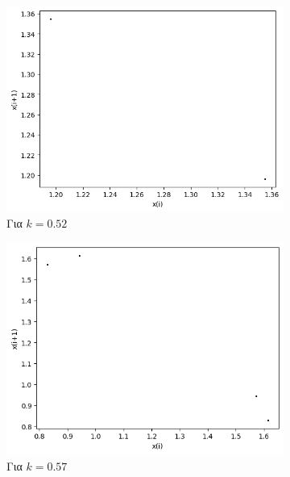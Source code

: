 \begin{figure}[ht]
\begin{subfigure}[b]{0.4\textwidth}
		\centering
		\includegraphics[width=\textwidth]{LateX images/graphs q07/g5}
		\caption{Για $k=0.52$}
		\label{f:k39}
	\end{subfigure}
	\hfill
	\begin{subfigure}[b]{0.4\textwidth}
		\centering
		\includegraphics[width=\textwidth]{LateX images/graphs q07/g6}
		\caption{Για $k=0.57$}
		\label{f:k40}
	\end{subfigure}
	\hfill
	\begin{subfigure}[b]{0.4\textwidth}
		\centering

\end{subfigure}
\end{figure}
